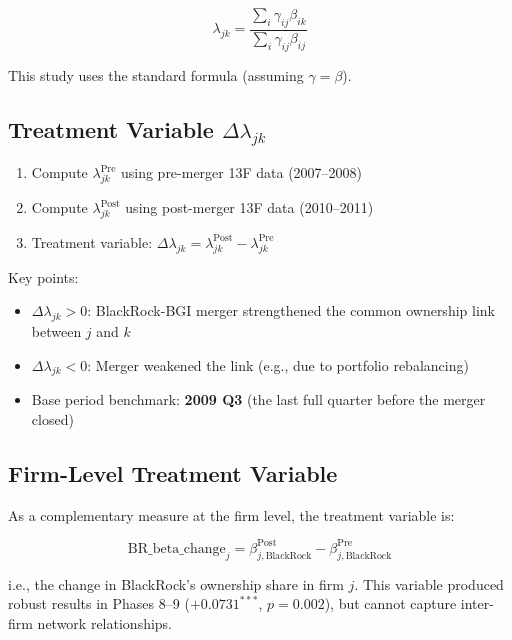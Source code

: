 \documentclass[11pt,a4paper]{article}
\begin{document}
\begin{equation}
\lambda_{jk} = \frac{\sum_i \gamma_{ij} \beta_{ik}}{\sum_i \gamma_{ij} \beta_{ij}}
\end{equation}

This study uses the standard formula (assuming \(\gamma = \beta\)).

\subsection{Treatment Variable \(\Delta\lambda_{jk}\)}

\begin{enumerate}[leftmargin=*]
  \item Compute \(\lambda_{jk}^{\text{Pre}}\) using pre-merger 13F data (2007--2008)
  \item Compute \(\lambda_{jk}^{\text{Post}}\) using post-merger 13F data (2010--2011)
  \item Treatment variable: \(\Delta\lambda_{jk} = \lambda_{jk}^{\text{Post}} - \lambda_{jk}^{\text{Pre}}\)
\end{enumerate}

Key points:
\begin{itemize}
  \item \(\Delta\lambda_{jk} > 0\): BlackRock-BGI merger strengthened the common ownership link between \(j\) and \(k\)
  \item \(\Delta\lambda_{jk} < 0\): Merger weakened the link (e.g., due to portfolio rebalancing)
  \item Base period benchmark: {\bf 2009 Q3} (the last full quarter before the merger closed)
\end{itemize}

\subsection{Firm-Level Treatment Variable}

As a complementary measure at the firm level, the treatment variable is:

\begin{equation}
\text{BR\_beta\_change}_j = \beta_{j, \text{BlackRock}}^{\text{Post}} - \beta_{j, \text{BlackRock}}^{\text{Pre}}
\end{equation}

i.e., the change in BlackRock's ownership share in firm \(j\). This variable produced robust results in Phases 8--9 (\(+0.0731^{***}\), \(p=0.002\)), but cannot capture inter-firm network relationships.
\end{document}
